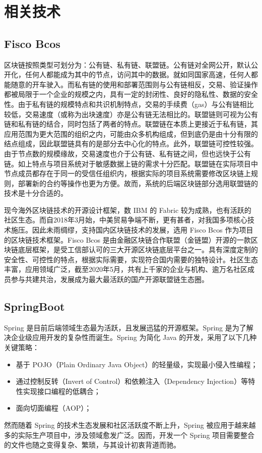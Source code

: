 \section{相关技术}
\subsection{Fisco Bcos}
区块链按照类型可划分为：公有链、私有链、联盟链。公有链对全网公开，默认公开化，任何人都能成为其中的节点，访问其中的数据。就如同国家高速，任何人都能随意的开车驶入。而私有链的使用和部署范围则与公有链相反，交易、验证操作都被局限于一个企业的规模之内，具有一定的封闭性、良好的隐私性、数据的安全性。由于私有链的规模特点和共识机制特点，交易的手续费（gas）与公有链相比较低，交易速度（或称为出块速度）亦是公有链无法相比的。联盟链则可视为公有链和私有链的结合，同时包括了两者的特点。联盟链在本质上更接近于私有链，其应用范围为更大范围的组织之内，可能由众多机构组成，但到底仍是由十分有限的结点组成，因此联盟链具有的是部分去中心化的特点。此外，联盟链可控性较强。由于节点数的规模缘故，交易速度也介于公有链、私有链之间，但也远快于公有链。如上特点与项目系统对于敏感数据上链的需求十分匹配。联盟链在实际项目中节点成员都存在于同一的受信任组织内，根据实际的项目系统需要修改区块链上规则，部署新的合约等操作也更为方便。故而，系统的后端区块链部分选用联盟链的技术是十分合适的。

现今海外区块链技术的开源设计框架，数 IBM 的 Fabric 较为成熟，也有活跃的社区生态。而自2018年3月始，中美贸易争端不断，更有甚者，对我国多项核心技术施压。因此未雨绸缪，支持国内区块链技术的发展，选用 Fisco Bcos 作为项目的区块链技术框架。Fisco Bcos 是由金融区块链合作联盟（金链盟）开源的一款区块链底层框架，是受工信部认可的三大开源区块链底层平台之一。具有深度定制的安全性、可控性的特点，根据实际需要，实现符合国内需要的独特设计。社区生态丰富，应用领域广泛，截至2020年5月，共有上千家的企业与机构、逾万名社区成员参与共建共治，发展成为最大最活跃的国产开源联盟链生态圈。

\subsection{SpringBoot}
Spring 是目前后端领域生态最为活跃，且发展迅猛的开源框架。Spring 是为了解决企业级应用开发的复杂性而诞生。Spring 为简化 Java 的开发，采用了以下几种关键策略：
\begin{itemize}
    \item 基于 POJO（Plain Ordinary Java Object）的轻量级，实现最小侵入性编程；
    \item 通过控制反转（Invert of Control）和依赖注入（Dependency Injection）等特性实现接口编程的低耦合；
    \item 面向切面编程（AOP）；
\end{itemize}
然而随着 Spring 的技术生态发展和社区活跃度不断上升，Spring 被应用于越来越多的实际生产项目中，涉及领域愈发广泛。因而，开发一个 Spring 项目需要整合的文件也随之变得复杂、繁琐，与其设计初衷背道而驰。

